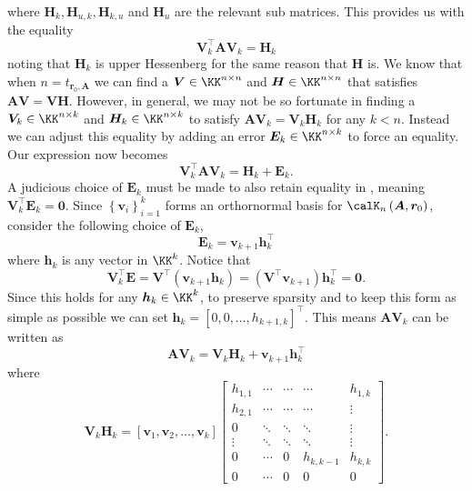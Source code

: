 where $\bm{H}_k , \bm{H}_{u,k}, \bm{H}_{k,u}$ and $\bm{H}_u$ are the relevant sub matrices. This provides us with the equality
\begin{equation}\label{eq: QTkAQk_eq_Hk}
    \bm{V}_{k}^{\intercal} \bm{A} \bm{V}_{k} = \bm{H}_k
\end{equation}
noting that $\bm{H}_{k}$ is upper Hessenberg for the same reason that $\bm{H}$ is. We know that when $n = t_{\bm{r}_0, \bm{A}}$ we can find a $\bm{V} \in \KK^{n \times n}$ and $\bm{H} \in \KK^{n \times n}$ that satisfies $\bm{A} \bm{V} = \bm{V} \bm{H}$. However, in general, we may not be so fortunate in finding a $\bm{V}_{k} \in \KK^{n \times k}$ and $\bm{H}_{k} \in \KK^{n \times k}$ to satisfy $\bm{A} \bm{V}_{k} = \bm{V}_{k} \bm{H}_k$ for any $k < n$. Instead we can adjust this equality by adding an error $\bm{E}_k \in \KK^{n \times k}$ to force an equality. Our expression now becomes
\begin{equation}\label{eq: QTkAQk_eq_HkEk}
    \bm{V}_{k}^{\intercal} \bm{A} \bm{V}_{k} = \bm{H}_k + \bm{E}_k.
\end{equation}
A judicious choice of $\bm{E}_k$ must be made to also retain equality in , meaning $\bm{V}_{k}^{\intercal} \bm{E}_k = \bm{0}$. Since $\left\{ \bm{v}_i \right\}_{i=1}^{k}$ forms an orthornormal basis for $\calK_{n} \left( \bm{A}, \bm{r}_0 \right)$, consider the following choice of $\bm{E}_k$,
\[
    \bm{E}_k = \bm{v}_{k+1} \bm{h}_{k}^{\intercal}
\]
where $\bm{h}_k$ is any vector in $\KK^{k}$. Notice that
\[
    \bm{V}_{k}^{\intercal} \bm{E} = \bm{V}^{\intercal} \left( \bm{v}_{k+1} \bm{h}_k \right) = \left( \bm{V}^{\intercal} \bm{v}_{k+1} \right) \bm{h}_{k}^{\intercal} = \bm{0}.
\]
Since this holds for any $\bm{h}_k \in \KK^{k}$, to preserve sparsity and to keep this form as simple as possible we can set $\bm{h}_k = \left[ 0,0, \ldots , h_{k+1,k} \right]^{\intercal}$. This means $\bm{A} \bm{V}_k$ can be written as
\begin{equation}\label{eq: QTkAQk_eq_Hk_p_qkhk}
    \bm{A} \bm{V}_k =  \bm{V}_k \bm{H}_k + \bm{v}_{k+1} \bm{h}_{k}^{\intercal}
\end{equation}
where
\[
    \bm{V}_k \bm{H}_k =
    \left[ \bm{v}_1 , \bm{v}_2 , \ldots , \bm{v}_k \right]
    \begin{bmatrix}
        h_{1,1} & \cdots & \cdots & \cdots    & h_{1,k} \\
        h_{2,1} & \cdots & \cdots & \cdots    & \vdots  \\
        0       & \ddots & \ddots & \ddots    & \vdots  \\
        \vdots  & \ddots & \ddots & \ddots    & \vdots  \\
        0       & \cdots & 0      & h_{k,k-1} & h_{k,k} \\
        0       & \cdots & 0      & 0         & 0
    \end{bmatrix}.
\]
